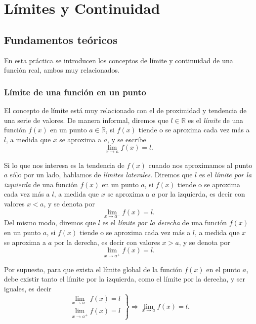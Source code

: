 
\chapter{Límites y Continuidad}

\section{Fundamentos teóricos}
En esta práctica se introducen los conceptos de límite y continuidad de una función real, ambos muy relacionados.

\subsection{Límite de una función en un punto}
El concepto de límite está muy relacionado con el de proximidad y tendencia de una serie de valores. De manera informal, diremos que $l\in \mathbb{R}$ es el \emph{límite} de una función $f(x)$ en un punto $a\in \mathbb{R}$, si $f(x)$ tiende o se aproxima cada vez más a $l$, a medida que $x$ se aproxima a $a$, y se escribe
\[ \lim_{x\rightarrow a} f(x)=l.\]

Si lo que nos interesa es la tendencia de $f(x)$ cuando nos aproximamos al punto $a$ sólo por un lado, hablamos de \emph{límites laterales}. Diremos que $l$ es el \emph{límite por la izquierda} de una función $f(x)$ en un punto $a$, si $f(x)$ tiende o se aproxima cada vez más a $l$, a medida que $x$ se aproxima a $a$ por la izquierda, es decir con valores $x<a$, y se denota por
\[ \lim_{x\rightarrow a^-} f(x)=l.\]
Del mismo modo, diremos que $l$ es el \emph{límite por la derecha} de una función $f(x)$ en un punto $a$, si $f(x)$ tiende o se aproxima cada vez más a $l$, a medida que $x$ se aproxima a $a$ por la derecha, es decir con valores $x>a$, y se denota por
\[ \lim_{x\rightarrow a^+} f(x)=l.\]

Por supuesto, para que exista el límite global de la función $f(x)$ en el punto $a$, debe existir tanto el límite por la izquierda, como el límite por la derecha, y ser iguales, es decir
\[
\left.
\begin{array}{l}
\displaystyle \lim_{x\rightarrow a^-} f(x)=l\\
\displaystyle \lim_{x\rightarrow a^+} f(x)=l
\end{array}
\right\}
\Longrightarrow
\lim_{x\rightarrow a} f(x)=l.
\]

